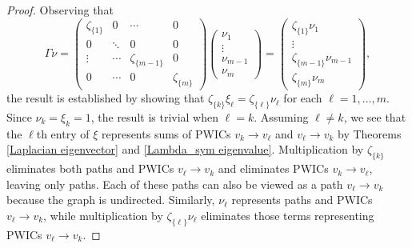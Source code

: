 \documentclass{article}
\theoremstyle{definition}
\numberwithin{equation}{section}
\begin{document}
\begin{proof}
Observing that 
\begin{equation*}
\Gamma\nu=\displaystyle\begin{pmatrix}
\zeta_{\{1\}}&0&\cdots&0\\
0&\ddots&0&0\\
\vdots&\cdots&\zeta_{\{m-1\}}&0\\
0&\cdots&0&\zeta_{\{m\}}\end{pmatrix}\begin{pmatrix}
\nu_1\\
\vdots\\
\nu_{m-1}\\
\nu_m
\end{pmatrix}=\begin{pmatrix}
\zeta_{\{1\}}\nu_1\\
\vdots\\
\zeta_{\{m-1\}}\nu_{m-1}\\
\zeta_{\{m\}}\nu_m
\end{pmatrix},
\end{equation*}
the result is established by showing that $\zeta_{\{k\}}\xi_\ell=\zeta_{\{\ell\}}\nu_\ell$ for each $\ell=1,\ldots, m$.  Since $\nu_k=\xi_k=1$, the result is trivial when $\ell=k$. Assuming $\ell\ne k$, we see that the $\ell$th entry of $\xi$ represents sums of PWICs $v_k\to v_\ell$ and $v_\ell\to v_k$ by Theorems \ref{Laplacian eigenvector} and \ref{Lambda_sym eigenvalue}.  Multiplication by $\zeta_{\{k\}}$ eliminates both paths and PWICs $v_\ell\to v_k$ and eliminates PWICs $v_k\to v_\ell$, leaving only paths.  Each of these paths can also be viewed as a path $v_\ell\to v_k$ because the graph is undirected.  Similarly, $\nu_\ell$ represents paths and PWICs $v_\ell\to v_k$, while multiplication by $\zeta_{\{\ell\}}\nu_\ell$ eliminates those terms representing PWICs $v_\ell\to v_k$.
\end{proof}
\end{document}
